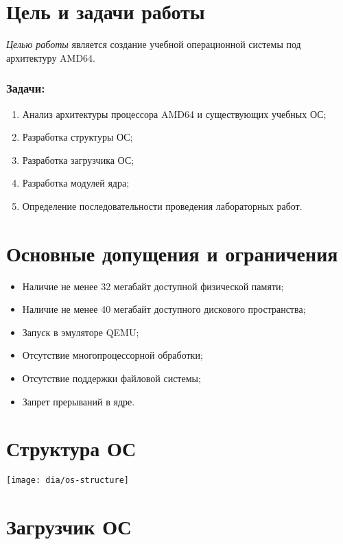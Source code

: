 \documentclass[12pt]{article}
\begin{document}
\TitleSlide

\section{\textbf{Цель и задачи работы}}
\emph{Целью работы} является создание учебной операционной системы под архитектуру AMD64.

\subsubsection{Задачи:}
\begin{enumerate}
\item Анализ архитектуры процессора AMD64 и существующих учебных ОС;
\item Разработка структуры ОС;
\item Разработка загрузчика ОС;
\item Разработка модулей ядра;
\item Определение последовательности проведения лабораторных работ.
\end{enumerate}


\section{\textbf{Основные допущения и ограничения}}
\begin{itemize}
\item Наличие не менее 32 мегабайт доступной физической памяти;
\item Наличие не менее 40 мегабайт доступного дискового пространства;
\item Запуск в эмуляторе QEMU;
\item Отсутствие многопроцессорной обработки;
\item Отсутствие поддержки файловой системы;
\item Запрет прерываний в ядре.
\end{itemize}

\section{\textbf{Структура ОС}}
\begin{center}
\texttt{[image: dia/os-structure]}
\end{center}


\section{\textbf{Загрузчик ОС}}
\end{document}
